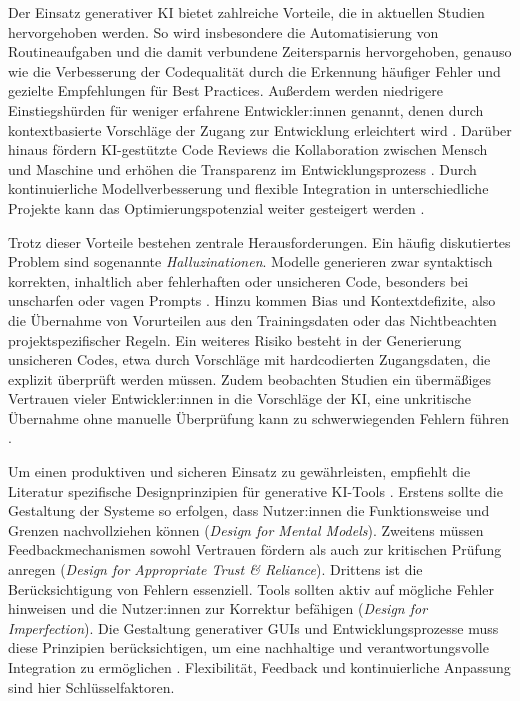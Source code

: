 Der Einsatz generativer KI bietet zahlreiche Vorteile, die in aktuellen Studien
hervorgehoben werden. So wird insbesondere die Automatisierung von
Routineaufgaben und die damit verbundene Zeitersparnis hervorgehoben, genauso
wie die Verbesserung der Codequalität durch die Erkennung häufiger Fehler und
gezielte Empfehlungen für Best Practices. Außerdem werden niedrigere
Einstiegshürden für weniger erfahrene Entwickler:innen genannt, denen durch
kontextbasierte Vorschläge der Zugang zur Entwicklung erleichtert wird
\cite{donvir_role_2024, sergeyuk_human-ai_2025}. Darüber hinaus fördern
KI-gestützte Code Reviews die Kollaboration zwischen Mensch und Maschine und
erhöhen die Transparenz im Entwicklungsprozess \cite{alami_human_2025}. Durch
kontinuierliche Modellverbesserung und flexible Integration in unterschiedliche
Projekte kann das Optimierungspotenzial weiter gesteigert werden
\cite{kerr_github_nodate, weisz_design_2024}.

Trotz dieser Vorteile bestehen zentrale Herausforderungen. Ein häufig
diskutiertes Problem sind sogenannte \textit{Halluzinationen}. Modelle
generieren zwar syntaktisch korrekten, inhaltlich aber fehlerhaften oder
unsicheren Code, besonders bei unscharfen oder vagen Prompts
\cite{shi_ai-assisted_2023, weisz_design_2024}. Hinzu kommen Bias und
Kontextdefizite, also die Übernahme von Vorurteilen aus den Trainingsdaten oder
das Nichtbeachten projektspezifischer Regeln. Ein weiteres Risiko besteht in
der Generierung unsicheren Codes, etwa durch Vorschläge mit hardcodierten
Zugangsdaten, die explizit überprüft werden müssen. Zudem beobachten Studien
ein übermäßiges Vertrauen vieler Entwickler:innen in die Vorschläge der KI,
eine unkritische Übernahme ohne manuelle Überprüfung kann zu schwerwiegenden
Fehlern führen \cite{shi_ai-assisted_2023, weisz_design_2024}.

Um einen produktiven und sicheren Einsatz zu gewährleisten, empfiehlt die
Literatur spezifische Designprinzipien für generative KI-Tools
\cite{weisz_design_2024}. Erstens sollte die Gestaltung der Systeme so
erfolgen, dass Nutzer:innen die Funktionsweise und Grenzen nachvollziehen
können (\textit{Design for Mental Models}). Zweitens müssen Feedbackmechanismen
sowohl Vertrauen fördern als auch zur kritischen Prüfung anregen
(\textit{Design for Appropriate Trust \& Reliance}). Drittens ist die
Berücksichtigung von Fehlern essenziell. Tools sollten aktiv auf mögliche
Fehler hinweisen und die Nutzer:innen zur Korrektur befähigen (\textit{Design
    for Imperfection}). Die Gestaltung generativer GUIs und Entwicklungsprozesse
muss diese Prinzipien berücksichtigen, um eine nachhaltige und
verantwortungsvolle Integration zu ermöglichen \cite{lee_towards_2025,
    chen_genui_2025, gill_agile_2025}. Flexibilität, Feedback und kontinuierliche
Anpassung sind hier Schlüsselfaktoren.

